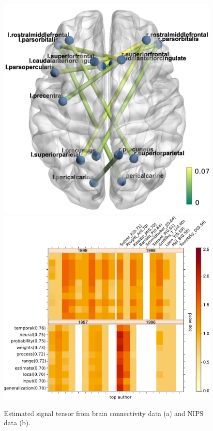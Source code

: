 \documentclass{article}
\theoremstyle{plain}
\theoremstyle{definition}
\begin{document}
\begin{table}[h!]
\vspace{-.2cm}
\caption{Comparison of prediction error in the MRN-114 and NIPS data analysis. For low-rank CPT, we use R function {\tt rTensor} with default hyperparameters, and for our method, we set $H = 20$.}\label{tab:data}
\vspace{-.3cm}
\end{table}


\begin{figure}[h!]
\centering
\includegraphics[width=.2\textwidth]{figure/brainIQ.pdf}
\includegraphics[width=.27\textwidth]{figure/signal.pdf}
\caption{Estimated signal tensor from brain connectivity data (a) and NIPS data (b). %
}\label{fig:signal}
\vspace{-.5cm}
\end{figure}
\end{document}
